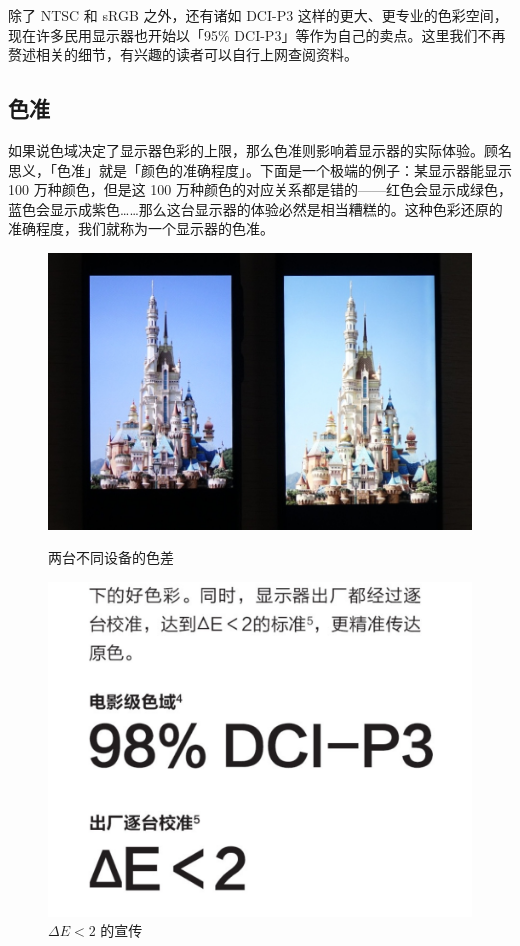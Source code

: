 除了 NTSC 和 sRGB 之外，还有诸如 DCI-P3 这样的更大、更专业的色彩空间，现在许多民用显示器也开始以「95\% DCI-P3」等作为自己的卖点。这里我们不再赘述相关的细节，有兴趣的读者可以自行上网查阅资料。

\subsection{色准}

如果说色域决定了显示器色彩的上限，那么色准则影响着显示器的实际体验。顾名思义，「色准」就是「颜色的准确程度」。下面是一个极端的例子：某显示器能显示 100 万种颜色，但是这 100 万种颜色的对应关系都是错的——红色会显示成绿色，蓝色会显示成紫色……那么这台显示器的体验必然是相当糟糕的。这种色彩还原的准确程度，我们就称为一个显示器的色准。


\begin{figure}[htb!]
  \centering
  \begin{minipage}{.58\textwidth}
    \centering
    \includegraphics[width=.98\textwidth]{assets/advanced/Colour_correctness.jpeg}
    \caption{两台不同设备的色差}
    \label{fig:Colour_correctness}
  \end{minipage}
  \begin{minipage}{.41\textwidth}
    \centering
    \includegraphics[width=.98\textwidth]{assets/advanced/DCI_P3_ad.png}
    \caption{$\Delta E < 2$ 的宣传}
    \label{fig:DCI_P3_ad}
  \end{minipage}
\end{figure}

